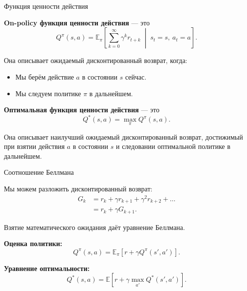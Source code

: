 \documentclass{beamer}
\begin{document}
	
	\begin{frame}{Функция ценности действия}
		
		\begin{flushleft}
			\textbf{On-policy функция ценности действия} — это
			\[
			Q^\pi(s,a)=
			\mathbb{E}_\pi\left[
			\sum_{k=0}^{\infty}\gamma^k r_{t+k}
			\;\middle|\;
			s_t=s,\ a_t=a
			\right].
			\]
			
			\vspace{0.2cm}
			
			Она описывает ожидаемый дисконтированный возврат, когда:
			\begin{itemize}
				\item Мы берём действие $a$ в состоянии $s$ сейчас.
				\item Мы следуем политике $\pi$ в дальнейшем.
			\end{itemize}
			
			\vspace{0.3cm}
			
			\textbf{Оптимальная функция ценности действия} — это
			\[
			Q^*(s,a)=\max_\pi Q^\pi(s,a).
			\]
			
			Она описывает наилучший ожидаемый дисконтированный возврат, достижимый
			при взятии действия $a$ в состоянии $s$ и следовании
			оптимальной политике в дальнейшем.
			
		\end{flushleft}
	\end{frame}
	
	
	\begin{frame}{Соотношение Беллмана}
		\begin{flushleft}
			
			Мы можем разложить дисконтированный возврат:
			\[
			\begin{aligned}
				G_k
				&=r_k+\gamma r_{k+1}+\gamma^2r_{k+2}+\ldots\\
				&=r_k+\gamma G_{k+1}.
			\end{aligned}
			\]
			
			\vspace{0.3cm}
			
			Взятие математического ожидания даёт уравнение Беллмана.
			
			\textbf{Оценка политики:}
			\[
			Q^\pi(s,a)=
			\mathbb{E}_\pi\left[
			r+\gamma Q^\pi(s',a')
			\right].
			\]
			
			\vspace{0.2cm}
			
			\textbf{Уравнение оптимальности:}
			\[
			Q^*(s,a)=
			\mathbb{E}\left[
			r+\gamma\max_{a'}Q^*(s',a')
			\right].
			\]
			
		\end{flushleft}
	\end{frame}
	
\end{document}
